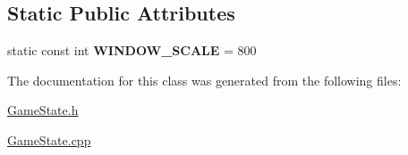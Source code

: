 \subsection*{Static Public Attributes}
\begin{DoxyCompactItemize}
\item 
\hypertarget{class_game_state_acb273d0f4a997287f1514c869195b587}{}\label{class_game_state_acb273d0f4a997287f1514c869195b587} 
static const int {\bfseries W\+I\+N\+D\+O\+W\+\_\+\+S\+C\+A\+LE} = 800
\end{DoxyCompactItemize}


The documentation for this class was generated from the following files\+:\begin{DoxyCompactItemize}
\item 
\hyperlink{_game_state_8h}{Game\+State.\+h}\item 
\hyperlink{_game_state_8cpp}{Game\+State.\+cpp}\end{DoxyCompactItemize}
